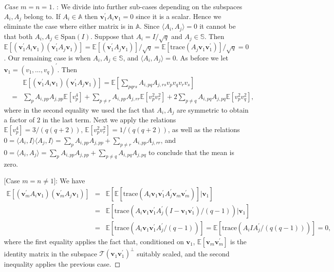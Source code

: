 \documentclass[11pt,letterpaper]{article}
\newcommand{\bv}{\mathbf{v}}
\newcommand{\ct}{\mathcal{T}}
\begin{document}
\begin{proof}
	[Case $m = n = 1$]: We divide into further sub-cases depending on the subspaces $A_i,A_j$ belong to. If $A_i \in \mathbb{A}$ then $\bv_1^{\prime}A_i \bv_1 = 0$ since it is a scalar. Hence we eliminate the case where either matrix is in $\mathbb{A}$. Since $\langle A_i,A_j \rangle = 0$ it cannot be that both $A_i,A_j \in \mathrm{Span}(I)$. Suppose that $A_i = I / \sqrt{q}$ and $A_j \in \mathbb{S}$. Then $\mathbb{E} [ (\bv_1^{\prime}A_i \bv_1) (\bv_1^{\prime}A_j \bv_1)] = \mathbb{E} [ (\bv_1^{\prime}A_j \bv_1)]/\sqrt{q} = \mathbb{E} [ \mathrm{trace}(A_j \bv_1 \bv^{\prime}_1)]/\sqrt{q}=0$. Our remaining case is when $A_i,A_j \in \mathbb{S}$, and $\langle A_i,A_j \rangle = 0$. As before we let $\bv_1 = (v_1,\ldots,v_q)^{\prime}$. Then
	\begin{eqnarray*}
		& & \mathbb{E} [ (\bv^{\prime}_{1} A_i \bv_1) (\bv^{\prime}_1 A_j \bv_1)]  = \mathbb{E} [\sum_{pqrs} A_{i,pq} A_{j,rs} v_p v_q v_r v_s] \\
		& = & \sum_{p} A_{i,pp} A_{j,pp} \mathbb{E}[v_p^4] + \sum_{p\neq r} A_{i,pp} A_{j,rr} \mathbb{E}[v_p^2 v_r^2] + 2 \sum_{p\neq q} A_{i,pq} A_{j,pq}\mathbb{E}[v_p^2 v_q^2],
	\end{eqnarray*}
	where in the second equality we used the fact that $A_i,A_j$ are symmetric to obtain a factor of $2$ in the last term. Next we apply the relations $\mathbb{E}[v_p^4] = 3/(q(q+2))$, $ \mathbb{E}[v_p^2 v_r^2] = 1/(q(q+2))$, as well as the relations $0=\langle A_i, I \rangle \langle A_j, I\rangle=\sum_{p} A_{i,pp}A_{j,pp} + \sum_{p\neq r} A_{i,pp}A_{j,rr}$, and $0=\langle A_i, A_j \rangle = \sum_{p} A_{i,pp}A_{j,pp} + \sum_{p\neq q} A_{i,pq}A_{j,pq}$ to conclude that the mean is zero.
	
	[Case $m = n \neq 1$]: We have
	\begin{eqnarray*}
		\mathbb{E} [ (\bv^{\prime}_{m} A_i \bv_1) (\bv^{\prime}_m A_j \bv_1)] & = & \mathbb{E}[\mathbb{E} [ \mathrm{trace}(A_i \bv_1 \bv_1^{\prime} A_j^{\prime} \bv_m \bv^{\prime}_m)]|\bv_1] \\
		& = & \mathbb{E}[ \mathrm{trace}( A_i \bv_1 \bv_1^{\prime} A_j^{\prime} (I-\bv_1 \bv_1^{\prime})/(q-1))|\bv_1] \\
		& = & \mathbb{E} [ \mathrm{trace}( A_i \bv_1 \bv_1^{\prime} A_j^{\prime} /(q-1))] = \mathbb{E} [ \mathrm{trace}( A_i I A_j^{\prime} / (q(q-1)))] = 0,
	\end{eqnarray*}
	where the first equality applies the fact that, conditioned on $\bv_1$, $\mathbb{E}[\bv_m \bv^{\prime}_m]$ is the identity matrix in the subspace $\ct(\bv_1 \bv_1^{\prime})^{\perp}$ suitably scaled, and the second inequality applies the previous case.
\end{proof}
\end{document}
